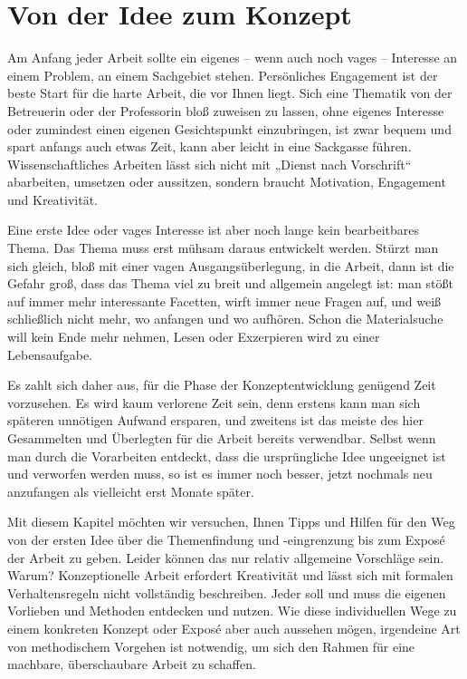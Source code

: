 \documentclass[]{book}
\theoremstyle{definition}
\theoremstyle{definition}
\theoremstyle{definition}
\theoremstyle{remark}
\begin{document}
\section{Von der Idee zum Konzept}\label{von-der-idee-zum-konzept}

Am Anfang jeder Arbeit sollte ein eigenes -- wenn auch noch vages --
Interesse an einem Problem, an einem Sachgebiet stehen. Persönliches
Engagement ist der beste Start für die harte Arbeit, die vor Ihnen
liegt. Sich eine Thematik von der Betreuerin oder der Professorin bloß
zuweisen zu lassen, ohne eigenes Interesse oder zumindest einen eigenen
Gesichtspunkt einzubringen, ist zwar bequem und spart anfangs auch etwas
Zeit, kann aber leicht in eine Sackgasse führen. Wissenschaftliches
Arbeiten lässt sich nicht mit „Dienst nach Vorschrift`` abarbeiten,
umsetzen oder aussitzen, sondern braucht Motivation, Engagement und
Kreativität.

Eine erste Idee oder vages Interesse ist aber noch lange kein
bearbeitbares Thema. Das Thema muss erst mühsam daraus entwickelt
werden. Stürzt man sich gleich, bloß mit einer vagen Ausgangsüberlegung,
in die Arbeit, dann ist die Gefahr groß, dass das Thema viel zu breit
und allgemein angelegt ist: man stößt auf immer mehr interessante
Facetten, wirft immer neue Fragen auf, und weiß schließlich nicht mehr,
wo anfangen und wo aufhören. Schon die Materialsuche will kein Ende mehr
nehmen, Lesen oder Exzerpieren wird zu einer Lebensaufgabe.

Es zahlt sich daher aus, für die Phase der Konzeptentwicklung genügend
Zeit vorzusehen. Es wird kaum verlorene Zeit sein, denn erstens kann man
sich späteren unnötigen Aufwand ersparen, und zweitens ist das meiste
des hier Gesammelten und Überlegten für die Arbeit bereits verwendbar.
Selbst wenn man durch die Vorarbeiten entdeckt, dass die ursprüngliche
Idee ungeeignet ist und verworfen werden muss, so ist es immer noch
besser, jetzt nochmals neu anzufangen als vielleicht erst Monate später.

Mit diesem Kapitel möchten wir versuchen, Ihnen Tipps und Hilfen für den
Weg von der ersten Idee über die Themenfindung und -eingrenzung bis zum
Exposé der Arbeit zu geben. Leider können das nur relativ allgemeine
Vorschläge sein. Warum? Konzeptionelle Arbeit erfordert Kreativität und
lässt sich mit formalen Verhaltensregeln nicht vollständig beschreiben.
Jeder soll und muss die eigenen Vorlieben und Methoden entdecken und
nutzen. Wie diese individuellen Wege zu einem konkreten Konzept oder
Exposé aber auch aussehen mögen, irgendeine Art von methodischem
Vorgehen ist notwendig, um sich den Rahmen für eine machbare,
überschaubare Arbeit zu schaffen.
\end{document}
